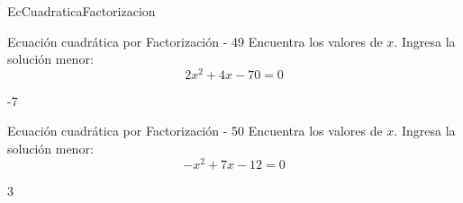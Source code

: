 \documentclass[a4,11pt]{aleph-notas}
\begin{document}
\begin{quiz}{EcCuadraticaFactorizacion}
\begin{numerical}[]%
    {Ecuación cuadrática por Factorización - 49}
    Encuentra los valores de $x$. Ingresa la solución menor:
    \[
        2 x^{2} + 4 x - 70 = 0
    \]
    \item[] -7
\end{numerical}

\begin{numerical}[]%
    {Ecuación cuadrática por Factorización - 50}
    Encuentra los valores de $x$. Ingresa la solución menor:
    \[
        - x^{2} + 7 x - 12 = 0
    \]
    \item[] 3
\end{numerical}




\end{quiz}
\end{document}
